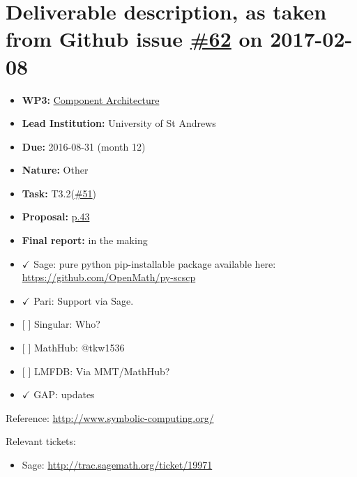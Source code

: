 \section*{\texorpdfstring{Deliverable description, as taken from Github
issue
\href{https://github.com/OpenDreamKit/OpenDreamKit/issues/62}{\#62} on
2017-02-08}{Deliverable description, as taken from Github issue \#62 on 2017-02-08}}\label{deliverable-description-as-taken-from-github-issue-62-on-2017-02-08}

\begin{itemize}
\tightlist
\item
  \textbf{WP3:}
  \href{https://github.com/OpenDreamKit/OpenDreamKit/tree/master/WP3}{Component
  Architecture}
\item
  \textbf{Lead Institution:} University of St Andrews
\item
  \textbf{Due:} 2016-08-31 (month 12)
\item
  \textbf{Nature:} Other
\item
  \textbf{Task:}
  T3.2(\href{https://github.com/OpenDreamKit/OpenDreamKit/issues/51}{\#51})
\item
  \textbf{Proposal:}
  \href{https://github.com/OpenDreamKit/OpenDreamKit/raw/master/Proposal/proposal-www.pdf}{p.43}
\item
  \textbf{Final report:} in the making
\item
  \(\checkmark\) Sage: pure python pip-installable package available
  here: \url{https://github.com/OpenMath/py-scscp}
\item
  \(\checkmark\) Pari: Support via Sage.
\item
  {[} {]} Singular: Who?
\item
  {[} {]} MathHub: @tkw1536
\item
  {[} {]} LMFDB: Via MMT/MathHub?
\item
  \(\checkmark\) GAP: updates
\end{itemize}

Reference: \url{http://www.symbolic-computing.org/}

Relevant tickets:

\begin{itemize}
\tightlist
\item
  Sage: \url{http://trac.sagemath.org/ticket/19971}
\end{itemize}
